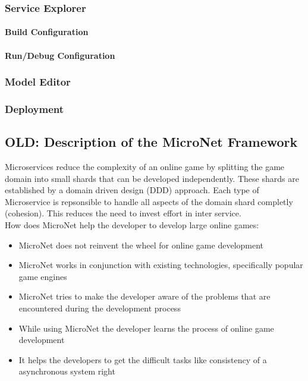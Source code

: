 \subsubsection{Service Explorer}

\paragraph{Build Configuration}

\paragraph{Run/Debug Configuration}

\subsubsection{Model Editor}

\subsubsection{Deployment}
















\subsection{OLD: Description of the MicroNet Framework}

Microservices reduce the complexity of an online game by splitting the game
domain into small shards that can be developed independently. These shards are
established by a domain driven design (DDD) approach. Each type of Microservice
is repsonsible to handle all aspects of the domain shard completly (cohesion).
This reduces the need to invest effort in inter service.\\

How does MicroNet help the developer to develop large online games:
\begin{itemize}
  \item MicroNet does not reinvent the wheel for online game development
  \item MicroNet works in conjunction with existing technologies, specifically popular game engines
  \item MicroNet tries to make the developer aware of the problems that are encountered during the development process
  \item While using MicroNet the developer learns the process of online game development 
  \item It helps the developers to get the difficult tasks like consistency of a
  asynchronous system right
\end{itemize}

